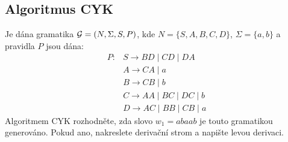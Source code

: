 \subsection{Algoritmus CYK} %
Je dána gramatika $\mathcal{G} = (N, \Sigma, S, P)$, kde 
$N = \{S, A, B, C, D\}$, $\Sigma = \{a, b\}$ a pravidla $P$ jsou dána:
\begin{align*}
    P: & S \rightarrow BD \mid CD \mid DA \\
       & A \rightarrow CA \mid a \\
       & B \rightarrow CB \mid b \\
       & C \rightarrow AA \mid BC \mid DC \mid b \\
       & D \rightarrow AC \mid BB \mid CB \mid a
\end{align*}
Algoritmem CYK rozhodněte, zda slovo $w_1 = abaab$ je touto gramatikou generováno. Pokud ano, nakreslete derivační strom 
a napište levou derivaci.

